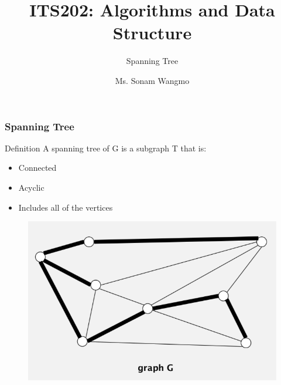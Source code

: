 \documentclass[11pt]{beamer}
\begin{document}
	\author{Ms. Sonam Wangmo}
	\title{ITS202: Algorithms and Data Structure}
	\subtitle{Spanning Tree}
	\institute{
		\textcolor{blue}{Gyalpozhing College of Information Technology \\ Royal University of Bhutan} \\
		\vspace{0.5cm}
	}
	\begin{frame}[plain]
		\maketitle
	\end{frame}

  \begin{frame}
 	\frametitle	{Spanning Tree} 
 \begin{block}{Definition}
 	A spanning tree of G is a subgraph T that is: 
 	\begin{itemize}
 		\item Connected
 		\item Acyclic
 		\item Includes all of the vertices
 	\end{itemize}
    \begin{figure}
    	\centering
    	\includegraphics[width=0.7\linewidth]{"Screenshot 2020-12-15 at 1.41.34 PM"}
    	\label{fig:screenshot-2020-12-15-at-1}
    \end{figure}    
 \end{block}
 \end{frame}
\end{document}
